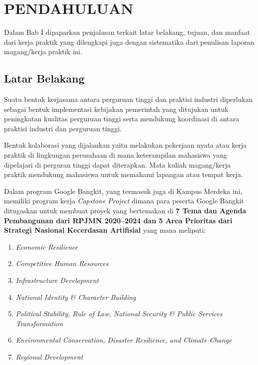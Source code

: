\chapter{PENDAHULUAN}

Dalam Bab I dipaparkan penjalasan terkait latar belakang, tujuan, dan manfaat dari kerja praktik yang dilengkapi juga dengan sistematika dari penulisan laporan magang/kerja praktik ini.
\section{Latar Belakang}

Suatu bentuk kerjasama antara perguruan tinggi dan praktisi industri diperlukan sebagai bentuk implementasi kebijakan pemerintah yang ditujukan untuk peningkatan kualitas perguruan tinggi serta mendukung koordinasi di antara praktisi industri dan perguruan tinggi.

Bentuk kolaborasi yang dijalankan yaitu melakukan pekerjaan nyata atau kerja praktik di lingkungan perusahaan di mana keterampilan mahasiswa yang dipelajari di perguran tinggi dapat diterapkan.
Mata kuliah magang/kerja praktik mendukung mahasiswa untuk memahami lapangan atau tempat kerja.

Dalam program Google Bangkit, yang termasuk juga di Kampus Merdeka ini, memiliki program kerja \textit{Capstone Project} dimana para peserta Google Bangkit ditugaskan untuk membuat proyek yang bertemakan di \textbf{7 Tema dan Agenda Pembangunan dari RPJMN 2020--2024 dan 5 Area Prioritas dari Strategi Nasional Kecerdasan Artifisial} \cite{RPJMN} yang mana meliputi:

\begin{enumerate}[nolistsep]

  \item \textit{Economic Resilience}

  \item \textit{Competitive Human Resources}

  \item \textit{Infrastructure Development}

  \item \textit{National Identity \& Character Building}

  \item \textit{Political Stability, Rule of Law, National Security \& Public Services Transformation}

  \item \textit{Environmental Conservation, Disaster Resilience, and Climate Change}

  \item \textit{Regional Development}

\end{enumerate}

